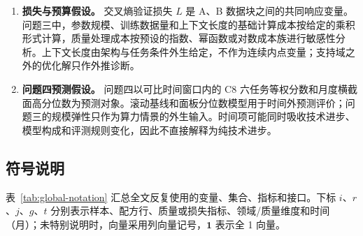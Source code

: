 \begin{enumerate}
  \item \textbf{损失与预算假设。} 交叉熵验证损失 $L$ 是 A、B 数据块之间的共同响应变量。问题三中，参数规模、训练数据量和上下文长度的基础计算成本按给定的乘积形式计算，质量处理成本按预设的指数、幂函数或对数成本族进行敏感性分析。上下文长度由架构与任务条件外生给定，不作为连续内点变量；支持域之外的优化解只作外推诊断。

  \item \textbf{问题四预测假设。} 问题四以可比时间窗口内的 C8 六任务等权分数和月度横截面高分位数为预测对象。滚动基线和面板分位数模型用于时间外预测评价；问题三的规模弹性只作为算力情景的外生输入。时间项可能同时吸收技术进步、模型构成和评测规则变化，因此不直接解释为纯技术进步。
\end{enumerate}

\subsection{符号说明}

表~\ref{tab:global-notation} 汇总全文反复使用的变量、集合、指标和接口。下标 $i$、$r$、$j$、$g$、$t$ 分别表示样本、配方行、质量或损失指标、领域/质量维度和时间（月）；未特别说明时，向量采用列向量记号，$\boldsymbol 1$ 表示全 1 向量。

